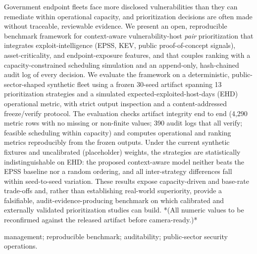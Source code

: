 Government endpoint fleets face more disclosed vulnerabilities than they can
remediate within operational capacity, and prioritization decisions are often made
without traceable, reviewable evidence. We present an open, reproducible benchmark
framework for context-aware vulnerability-host \textit{pair} prioritization that
integrates exploit-intelligence (EPSS, KEV, public proof-of-concept signals),
asset-criticality, and endpoint-exposure features, and that couples ranking with a
capacity-constrained scheduling simulation and an append-only, hash-chained audit
log of every decision. We evaluate the framework on a deterministic,
public-sector-shaped synthetic fleet using a frozen 30-seed artifact spanning 13
prioritization strategies and a simulated expected-exploited-host-days (EHD)
operational metric, with strict output inspection and a content-addressed
freeze/verify protocol. The evaluation checks artifact integrity end to end (4,290
metric rows with no missing or non-finite values; 390 audit logs that all verify;
feasible scheduling within capacity) and computes operational and ranking metrics
reproducibly from the frozen outputs. Under the current synthetic fixtures and
uncalibrated (placeholder) weights, the strategies are statistically
indistinguishable on EHD: the proposed context-aware model neither beats the EPSS
baseline nor a random ordering, and all inter-strategy differences fall within
seed-to-seed variation. These results expose capacity-driven and base-rate
trade-offs and, rather than establishing real-world superiority, provide a
falsifiable, audit-evidence-producing benchmark on which calibrated and externally
validated prioritization studies can build. *(All numeric values to be reconfirmed
against the released artifact before camera-ready.)*

management; reproducible benchmark; auditability; public-sector security operations.
